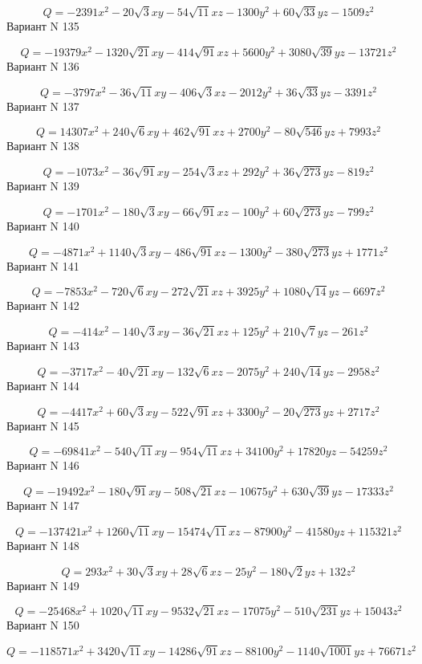 \documentclass[11pt]{report}
\begin{document}
$$Q = - 2391 x^{2} - 20 \sqrt{3} x y - 54 \sqrt{11} x z - 1300 y^{2} + 60 \sqrt{33} y z - 1509 z^{2}$$Вариант N 135

$$Q = - 19379 x^{2} - 1320 \sqrt{21} x y - 414 \sqrt{91} x z + 5600 y^{2} + 3080 \sqrt{39} y z - 13721 z^{2}$$Вариант N 136

$$Q = - 3797 x^{2} - 36 \sqrt{11} x y - 406 \sqrt{3} x z - 2012 y^{2} + 36 \sqrt{33} y z - 3391 z^{2}$$Вариант N 137

$$Q = 14307 x^{2} + 240 \sqrt{6} x y + 462 \sqrt{91} x z + 2700 y^{2} - 80 \sqrt{546} y z + 7993 z^{2}$$Вариант N 138

$$Q = - 1073 x^{2} - 36 \sqrt{91} x y - 254 \sqrt{3} x z + 292 y^{2} + 36 \sqrt{273} y z - 819 z^{2}$$Вариант N 139

$$Q = - 1701 x^{2} - 180 \sqrt{3} x y - 66 \sqrt{91} x z - 100 y^{2} + 60 \sqrt{273} y z - 799 z^{2}$$Вариант N 140

$$Q = - 4871 x^{2} + 1140 \sqrt{3} x y - 486 \sqrt{91} x z - 1300 y^{2} - 380 \sqrt{273} y z + 1771 z^{2}$$Вариант N 141

$$Q = - 7853 x^{2} - 720 \sqrt{6} x y - 272 \sqrt{21} x z + 3925 y^{2} + 1080 \sqrt{14} y z - 6697 z^{2}$$Вариант N 142

$$Q = - 414 x^{2} - 140 \sqrt{3} x y - 36 \sqrt{21} x z + 125 y^{2} + 210 \sqrt{7} y z - 261 z^{2}$$Вариант N 143

$$Q = - 3717 x^{2} - 40 \sqrt{21} x y - 132 \sqrt{6} x z - 2075 y^{2} + 240 \sqrt{14} y z - 2958 z^{2}$$Вариант N 144

$$Q = - 4417 x^{2} + 60 \sqrt{3} x y - 522 \sqrt{91} x z + 3300 y^{2} - 20 \sqrt{273} y z + 2717 z^{2}$$Вариант N 145

$$Q = - 69841 x^{2} - 540 \sqrt{11} x y - 954 \sqrt{11} x z + 34100 y^{2} + 17820 y z - 54259 z^{2}$$Вариант N 146

$$Q = - 19492 x^{2} - 180 \sqrt{91} x y - 508 \sqrt{21} x z - 10675 y^{2} + 630 \sqrt{39} y z - 17333 z^{2}$$Вариант N 147

$$Q = - 137421 x^{2} + 1260 \sqrt{11} x y - 15474 \sqrt{11} x z - 87900 y^{2} - 41580 y z + 115321 z^{2}$$Вариант N 148

$$Q = 293 x^{2} + 30 \sqrt{3} x y + 28 \sqrt{6} x z - 25 y^{2} - 180 \sqrt{2} y z + 132 z^{2}$$Вариант N 149

$$Q = - 25468 x^{2} + 1020 \sqrt{11} x y - 9532 \sqrt{21} x z - 17075 y^{2} - 510 \sqrt{231} y z + 15043 z^{2}$$Вариант N 150

$$Q = - 118571 x^{2} + 3420 \sqrt{11} x y - 14286 \sqrt{91} x z - 88100 y^{2} - 1140 \sqrt{1001} y z + 76671 z^{2}$$
\end{document}
